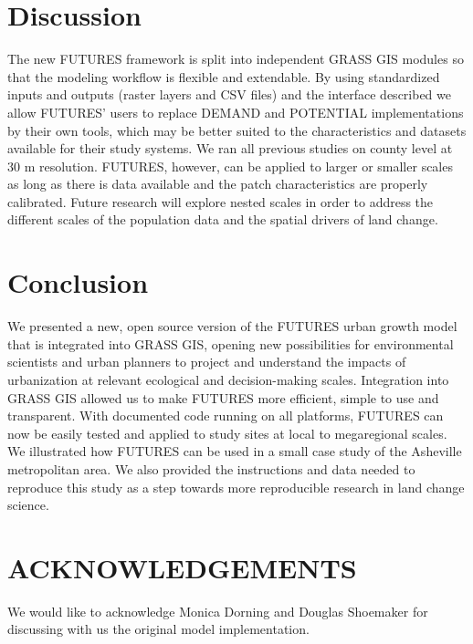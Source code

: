 \documentclass{isprs}
\begin{document}
\section{Discussion}
The new FUTURES framework is split into independent GRASS GIS modules
so that the modeling workflow is flexible and extendable.
By using standardized inputs and outputs (raster layers and CSV files)
and the interface described
we allow FUTURES' users to replace DEMAND and POTENTIAL implementations
by their own tools, which may be better suited to the characteristics and datasets available for their study systems.
We ran all previous studies on county level at 30 m resolution.
FUTURES, however, can be applied to larger or smaller scales
as long as there is data available and the patch characteristics are properly calibrated.
Future research will explore nested scales
in order to 
address the different scales of the population data
and the spatial drivers of land change.

\section{Conclusion}
We presented a new, open source version of the FUTURES urban growth model that is 
integrated into GRASS GIS,
opening new possibilities
for environmental scientists
and urban planners to 
project and understand the impacts of urbanization at relevant ecological and decision-making scales.
Integration into GRASS GIS allowed us to make FUTURES more efficient,
simple to use and transparent.
With documented code running on all platforms, FUTURES can now be easily tested
and applied to study sites at local to megaregional scales.
We illustrated how FUTURES can be used in a small case study of the Asheville metropolitan area.
We also provided the instructions and data 
needed to reproduce this study 
as a step towards more reproducible research in land change science.


\section*{ACKNOWLEDGEMENTS}\label{ACKNOWLEDGEMENTS}
We would like to acknowledge Monica Dorning and Douglas Shoemaker
for discussing with us the original model implementation.

 {%
 	\begin{spacing}{0.9}%
 	\end{spacing}
 }
\end{document}
